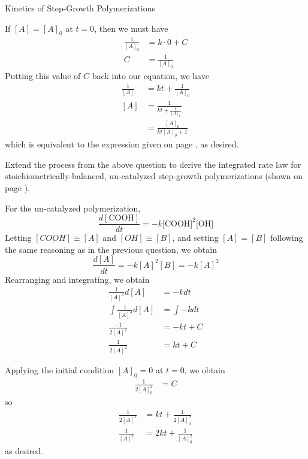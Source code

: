 \begin{activity}{Kinetics of Step-Growth Polymerizations}
\begin{exercises}
					\begin{solution}{}
						If $[A]=[A]_0$ at $t=0$, then we must have
						\begin{align*}
							\frac{1}{[A]_0} &= k\cdot 0 + C \\
							C &= \frac{1}{[A]_0}
						\end{align*}
						Putting this value of $C$ back into our equation, we have
						\begin{align*}
							\frac{1}{[A]} &= kt + \frac{1}{[A]_0} \\
							[A] &= \frac{1}{kt + \frac{1}{[A]_0}} \\
								&= \frac{[A]_0}{kt[A]_0 + 1}
						\end{align*}
						which is equivalent to the expression given on page \pageref{\labelbase:infobox:catintegrated}, as desired. 
						
					\end{solution}
			
		\exercise Extend the process from the above question to derive the integrated rate law for stoichiometrically-balanced, un-catalyzed step-growth polymerizations (shown on page \pageref{\labelbase:info:uncatintrate}).
				
					\begin{solution}{}
						For the un-catalyzed polymerization, 
						\begin{equation*}
							\frac{d[\text{COOH}]}{dt} = - k \text{[COOH]}^2\text{[OH]}
						\end{equation*}
						Letting $[COOH]\equiv [A]$ and $[OH]\equiv[B]$, and setting $[A]=[B]$ following the same reasoning as in the previous question, we obtain
						\begin{equation*}
							\frac{d[A]}{dt} = - k [A]^2[B] = -k[A]^3
						\end{equation*}
						Rearranging and integrating, we obtain
						\begin{align*}
							\frac{1}{[A]^3} d[A] &= -k dt \\
							\int \frac{1}{[A]^3} d[A] &= \int -k dt \\
							\frac{-1}{2[A]^2} &= -kt + C\\
							\frac{1}{2[A]^2} &= kt + C
						\end{align*}
					\end{solution}
					\begin{solution}{}
						Applying the initial condition $[A]_0=0$ at $t=0$, we obtain
						\begin{align*}
							\frac{1}{2[A]_0^2} &= C 
						\end{align*}
						so
						\begin{align*}
							\frac{1}{2[A]^2} &= kt + \frac{1}{2[A]_0^2} \\
							\frac{1}{[A]^2} &= 2kt + \frac{1}{[A]_0^2}
						\end{align*}
						as desired.
						

\end{solution}
\end{exercises}
\end{activity}
